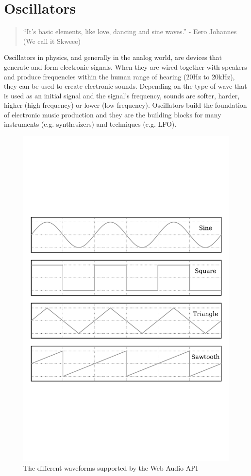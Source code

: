 \section{Oscillators}
\label{sec:webaudio-osc}

\begin{quote}
  ``It's basic elements, like love, dancing and sine waves.'' -
  Eero Johannes (We call it Skweee)
\end{quote}

Oscillators in physics, and generally in the analog world, are devices that generate and form electronic signals. When they are wired together with speakers and produce frequencies within the human range of hearing (20Hz to 20kHz), they can be used to create electronic sounds. Depending on the type of wave that is used as an initial signal and the signal's frequency, sounds are softer, harder, higher (high frequency) or lower (low frequency). Oscillators build the foundation of electronic music production and they are the building blocks for many instruments (e.g. synthesizers) and techniques (e.g. LFO).

\begin{figure}[htb]
  \centerline{\includegraphics[width=0.8\linewidth]{images/Waveforms.pdf}}
  \caption[The different waveforms supported by the Web Audio API -
  \protect{}
  \protect{}]{The different waveforms supported by the Web Audio API}
  \label{fig:waveforms}
\end{figure}

